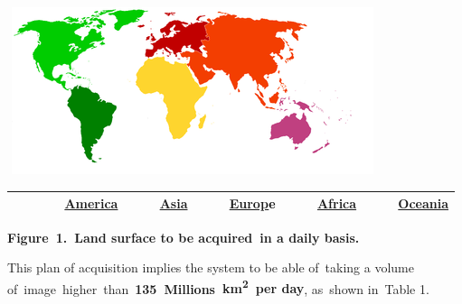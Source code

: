 \documentclass[a4paper]{article}
\begin{document}
\bigskip

{\centering 
\includegraphics[width=4.26944in,height=1.93056in]{out-img5.png} \par}

\begin{center}
\tablehead{}
\begin{supertabular}{m{0.8316598in}m{0.49065986in}m{0.67535985in}m{0.5906598in}m{0.73715985in}}
\hline
\centering
\textbf{\textcolor{black}{~~~}}\textbf{\textcolor{black}{~~~}}\textbf{\textcolor{black}{~}}\href{http://es.wikipedia.org/wiki/Am?rica}{\textbf{\textcolor[rgb]{0.043137256,0.0,0.5019608}{America}}}
&
\textbf{\textcolor{black}{~~~}}\textbf{\textcolor{black}{~}}\href{http://es.wikipedia.org/wiki/Asia}{\textbf{\textcolor[rgb]{0.043137256,0.0,0.5019608}{Asia}}}
&
\textbf{\textcolor{black}{~~~}}\textbf{\textcolor{black}{~}}\href{http://es.wikipedia.org/wiki/Europa}{\textbf{\textcolor[rgb]{0.043137256,0.0,0.5019608}{Europ}}}\textbf{\textcolor{black}{e}}
&
\textbf{\textcolor{black}{~~~}}\textbf{\textcolor{black}{~}}\href{http://es.wikipedia.org/wiki/?frica}{\textbf{\textcolor[rgb]{0.043137256,0.0,0.5019608}{Africa}}}
&
\textbf{\textcolor{black}{~~~}}\textbf{\textcolor{black}{~}}\href{http://es.wikipedia.org/wiki/Ocean?a}{\textbf{\textcolor[rgb]{0.043137256,0.0,0.5019608}{Oceania}}}\\\hline
\end{supertabular}
\end{center}
{\centering\bfseries
\label{bkm:Ref376877604}Figure\ 1.\ Land surface to be acquired\ in a
daily basis.
\par}


\bigskip

This plan of acquisition implies the system to be able of\ taking a
volume
of\ image\ higher\ than\ \textbf{135}\textbf{\ }\foreignlanguage{english}{\textbf{M}}\foreignlanguage{english}{\textbf{illions}}\textbf{\ km}\textbf{\textsuperscript{2}}\textbf{\ per
day}, as\ shown in\ Table 1.


\bigskip
\end{document}
